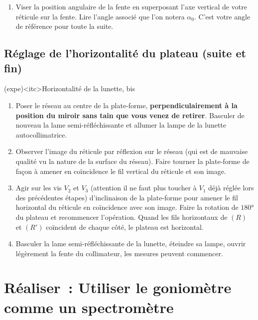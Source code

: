 \documentclass[../main/main.tex]{subfiles}
\begin{document}
{\begin{tcb}
  \begin{enumerate}[resume]
    \item Viser la position angulaire de la fente en superposant l'axe vertical
      de votre réticule sur la fente. Lire l'angle associé que l'on notera
      $\alpha_0$. C'est votre angle de référence pour toute la suite.
  \end{enumerate}
\end{tcb}

\subsection{Réglage de l'horizontalité du plateau (suite et fin)}

\begin{tcb}(expe)<itc>{Horizontalité de la lunette, bis}
  \begin{enumerate}
    \item Poser le réseau au centre de la plate-forme,
      \textbf{perpendiculairement à la position du miroir sans tain que vous
      venez de retirer}. Basculer de nouveau la lame semi-réfléchissante et
      allumer la lampe de la lunette autocollimatrice.

    \item Observer l'image du réticule par réflexion sur le réseau (qui est de
      mauvaise qualité vu la nature de la surface du réseau). Faire tourner la
      plate-forme de façon à amener en coïncidence le fil vertical du réticule
      et son image. 

    \item Agir sur les vis $V_2$ et $V_3$ (attention il ne faut plus toucher à
      $V_1$ déjà réglée lors des précédentes étapes) d'inclinaison de la
      plate-forme pour amener le fil horizontal du réticule en coïncidence avec
      son image. Faire la rotation de $\ang{180;;}$ du plateau et recommencer
      l'opération. Quand les fils horizontaux de $(R)$ et $(R')$ coïncident de
      chaque côté, le plateau est horizontal.

    \item Basculer la lame semi-réfléchissante de la lunette, éteindre sa lampe,
      ouvrir légèrement la fente du collimateur, les mesures peuvent commencer.
  \end{enumerate}
\end{tcb}
}

\setcounter{section}{3}
\section{Réaliser~: Utiliser le goniomètre comme un spectromètre}
\end{document}
